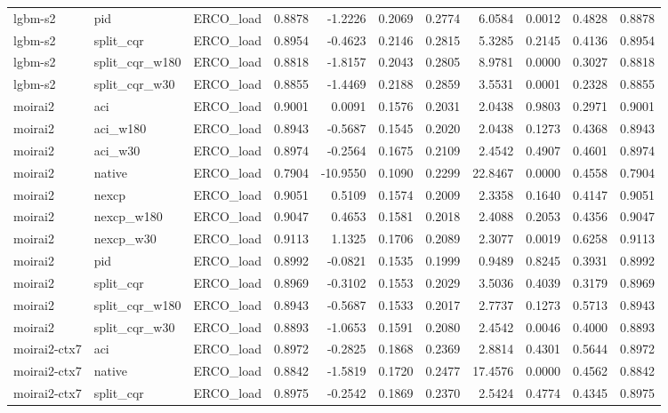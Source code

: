 \begin{tabular}{lllrrrrrrrr}
lgbm-s2 & pid & ERCO_load & 0.8878 & -1.2226 & 0.2069 & 0.2774 & 6.0584 & 0.0012 & 0.4828 & 0.8878 \\
lgbm-s2 & split_cqr & ERCO_load & 0.8954 & -0.4623 & 0.2146 & 0.2815 & 5.3285 & 0.2145 & 0.4136 & 0.8954 \\
lgbm-s2 & split_cqr_w180 & ERCO_load & 0.8818 & -1.8157 & 0.2043 & 0.2805 & 8.9781 & 0.0000 & 0.3027 & 0.8818 \\
lgbm-s2 & split_cqr_w30 & ERCO_load & 0.8855 & -1.4469 & 0.2188 & 0.2859 & 3.5531 & 0.0001 & 0.2328 & 0.8855 \\
moirai2 & aci & ERCO_load & 0.9001 & 0.0091 & 0.1576 & 0.2031 & 2.0438 & 0.9803 & 0.2971 & 0.9001 \\
moirai2 & aci_w180 & ERCO_load & 0.8943 & -0.5687 & 0.1545 & 0.2020 & 2.0438 & 0.1273 & 0.4368 & 0.8943 \\
moirai2 & aci_w30 & ERCO_load & 0.8974 & -0.2564 & 0.1675 & 0.2109 & 2.4542 & 0.4907 & 0.4601 & 0.8974 \\
moirai2 & native & ERCO_load & 0.7904 & -10.9550 & 0.1090 & 0.2299 & 22.8467 & 0.0000 & 0.4558 & 0.7904 \\
moirai2 & nexcp & ERCO_load & 0.9051 & 0.5109 & 0.1574 & 0.2009 & 2.3358 & 0.1640 & 0.4147 & 0.9051 \\
moirai2 & nexcp_w180 & ERCO_load & 0.9047 & 0.4653 & 0.1581 & 0.2018 & 2.4088 & 0.2053 & 0.4356 & 0.9047 \\
moirai2 & nexcp_w30 & ERCO_load & 0.9113 & 1.1325 & 0.1706 & 0.2089 & 2.3077 & 0.0019 & 0.6258 & 0.9113 \\
moirai2 & pid & ERCO_load & 0.8992 & -0.0821 & 0.1535 & 0.1999 & 0.9489 & 0.8245 & 0.3931 & 0.8992 \\
moirai2 & split_cqr & ERCO_load & 0.8969 & -0.3102 & 0.1553 & 0.2029 & 3.5036 & 0.4039 & 0.3179 & 0.8969 \\
moirai2 & split_cqr_w180 & ERCO_load & 0.8943 & -0.5687 & 0.1533 & 0.2017 & 2.7737 & 0.1273 & 0.5713 & 0.8943 \\
moirai2 & split_cqr_w30 & ERCO_load & 0.8893 & -1.0653 & 0.1591 & 0.2080 & 2.4542 & 0.0046 & 0.4000 & 0.8893 \\
moirai2-ctx7 & aci & ERCO_load & 0.8972 & -0.2825 & 0.1868 & 0.2369 & 2.8814 & 0.4301 & 0.5644 & 0.8972 \\
moirai2-ctx7 & native & ERCO_load & 0.8842 & -1.5819 & 0.1720 & 0.2477 & 17.4576 & 0.0000 & 0.4562 & 0.8842 \\
moirai2-ctx7 & split_cqr & ERCO_load & 0.8975 & -0.2542 & 0.1869 & 0.2370 & 2.5424 & 0.4774 & 0.4345 & 0.8975 \\

\end{tabular}

